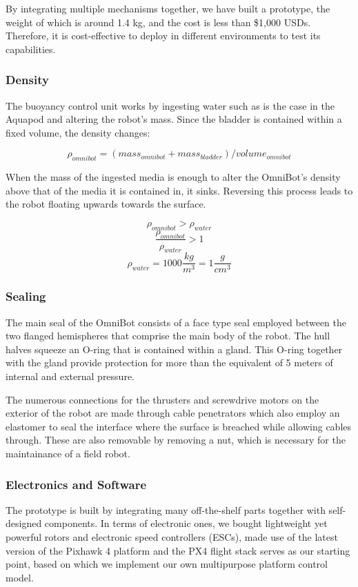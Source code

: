 By integrating multiple mechanisms together, we have built a prototype, the weight of which is around 1.4 kg, and the cost is less than \$1,000 USDs. Therefore, it is cost-effective to deploy in different environments to test its capabilities.

\subsubsection{Density}

The buoyancy control unit works by ingesting water such as is the case in the Aquapod \cite{Carlson2011} and altering the robot's mass. Since the bladder is contained within a fixed volume, the density changes:

$$ \rho_{omnibot} = (mass_{omnibot}+mass_{bladder})/volume_{omnibot} $$ 

When the mass of the ingested media is enough to alter the OmniBot's density above that of the media it is contained in, it sinks. Reversing this process leads to the robot floating upwards towards the surface. 

$$ \rho_{omnibot} > \rho_{water} $$
$$ \frac{\rho_{omnibot}}{\rho_{water} } > 1 $$
$$ \rho_{water} = 1000 \frac{kg}{m^3} = 1 \frac{g}{cm^3} $$ 

\subsubsection{Sealing}
The main seal of the OmniBot consists of a face type seal employed between the two flanged hemispheres that comprise the main body of the robot. The hull halves squeeze an O-ring that is contained within a gland. This O-ring together with the gland provide protection for more than the equivalent of 5 meters of internal and external pressure. 

The numerous connections for the thrusters and screwdrive motors on the exterior of the robot are made through cable penetrators which also employ an elastomer to seal the interface where the surface is breached while allowing cables through. These are also removable by removing a nut, which is necessary for the maintainance of a field robot. 

\subsubsection{Electronics and Software}

The prototype is built by integrating many off-the-shelf parts together with self-designed components. In terms of electronic ones, we bought lightweight yet powerful rotors and electronic speed controllers (ESCs), made use of the latest version of the Pixhawk 4 platform \cite{pixhawkadmin_introducing_2018} and the PX4 flight stack \cite{noauthor_open_nodate} serves as our starting point, based on which we implement our own multipurpose platform control model.

